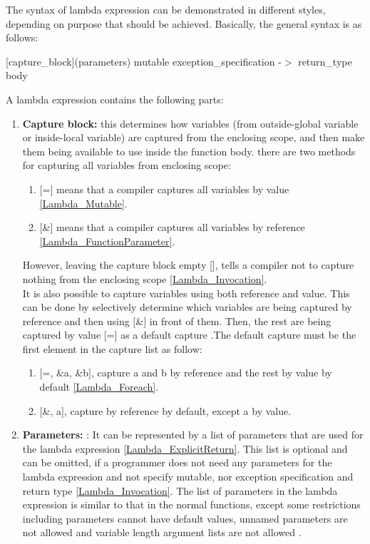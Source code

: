 \documentclass[11pt]{report}
\begin{document}
The syntax of lambda expression can be demonstrated in different styles, depending on purpose that should be achieved. Basically, the general syntax is as follows:
\begin{center}
[capture\_block](parameters) mutable exception\_specification -$>$ return\_type {body}
\end{center}

A lambda expression contains the following parts:
\begin{enumerate}
\item \textbf{Capture block:} this determines how variables (from outside-global variable or inside-local variable) are captured from the enclosing scope, and then make them being available to use inside the function body. there are two methods for capturing all variables from enclosing scope:

      \begin{enumerate}
      \item $[$=$]$ means that a compiler captures all variables by value \ref{Lambda_Mutable}.
      \item $[$\&$]$ means that a compiler captures all variables by reference 
             \ref{Lambda_FunctionParameter}.
      \end{enumerate}
      However, leaving the capture block empty [], tells a compiler not to capture nothing from the enclosing scope \ref{Lambda_Invocation}. \\
      It is also possible to capture variables using both reference and value. This can be done by selectively determine which variables are being captured by reference and then using $[$\&$]$ in front of them. Then, the rest are being captured by value $[$=$]$ as a default capture \cite{Gregorie:professionalcpp}.The default capture must be the first element in the capture list as follow:
      \begin{enumerate}
      \item $[$=, \&a, \&b$]$, capture a and b by reference and the rest by value by default \ref{Lambda_Foreach}.
      \item $[$\&, a$]$, capture by reference by default, except a by value.
      \end{enumerate}
      
      
\item \textbf{Parameters:} : It can be represented by a list of parameters that are used for the lambda expression \ref{Lambda_ExplicitReturn}. This list is optional and can be omitted, if a programmer does not need any parameters for the lambda expression and not specify mutable, nor exception specification and return type \ref{Lambda_Invocation}. The list of parameters in the lambda expression is similar to that in the normal functions, except some restrictions including parameters cannot have default values, unnamed parameters are not allowed and variable length argument lists are not allowed \cite{Cppreference:2012:Cpp11}.


\end{enumerate}
\end{document}
